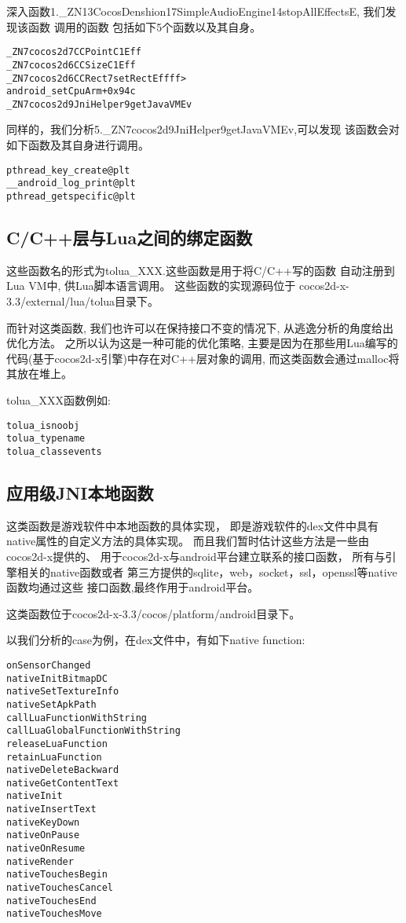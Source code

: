 深入函数1.\_ZN13CocosDenshion17SimpleAudioEngine14stopAllEffectsE,
我们发现该函数
调用的函数
包括如下5个函数以及其自身。
\begin{lstlisting}
_ZN7cocos2d7CCPointC1Eff
_ZN7cocos2d6CCSizeC1Eff
_ZN7cocos2d6CCRect7setRectEffff>
android_setCpuArm+0x94c
_ZN7cocos2d9JniHelper9getJavaVMEv
\end{lstlisting}

同样的，我们分析5.\_ZN7cocos2d9JniHelper9getJavaVMEv,可以发现 
该函数会对如下函数及其自身进行调用。

\begin{lstlisting}
pthread_key_create@plt
__android_log_print@plt
pthread_getspecific@plt
\end{lstlisting}

\subsection{C/C++层与Lua之间的绑定函数}
\label{sec:so:bindlib}
这些函数名的形式为tolua\_XXX.这些函数是用于将C/C++写的函数
自动注册到Lua VM中, 供Lua脚本语言调用。
这些函数的实现源码位于
cocos2d-x-3.3/external/lua/tolua目录下。

而针对这类函数,
我们也许可以在保持接口不变的情况下,
从逃逸分析的角度给出优化方法。
之所以认为这是一种可能的优化策略, 
主要是因为在那些用Lua编写的
代码(基于cocos2d-x引擎)中存在对C++层对象的调用, 
而这类函数会通过malloc将其放在堆上。

tolua\_XXX函数例如:\\
\begin{lstlisting}
tolua_isnoobj
tolua_typename
tolua_classevents
\end{lstlisting}

\subsection{应用级JNI本地函数}
\label{sec:so:appjnilib}
这类函数是游戏软件中本地函数的具体实现，
即是游戏软件的dex文件中具有native属性的自定义方法的具体实现。
而且我们暂时估计这些方法是一些由cocos2d-x提供的、
用于cocos2d-x与android平台建立联系的接口函数，
所有与引擎相关的native函数或者
第三方提供的sqlite，web，socket，ssl，openssl等native函数均通过这些
接口函数,最终作用于android平台。

这类函数位于cocos2d-x-3.3/cocos/platform/android目录下。

以我们分析的case为例，在dex文件中，有如下native function:
\begin{lstlisting}
onSensorChanged
nativeInitBitmapDC
nativeSetTextureInfo
nativeSetApkPath
callLuaFunctionWithString
callLuaGlobalFunctionWithString
releaseLuaFunction
retainLuaFunction
nativeDeleteBackward
nativeGetContentText
nativeInit
nativeInsertText
nativeKeyDown
nativeOnPause
nativeOnResume
nativeRender
nativeTouchesBegin
nativeTouchesCancel
nativeTouchesEnd
nativeTouchesMove
\end{lstlisting}

